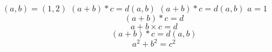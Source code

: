 \((a ,b)=(1 ,2)\)  %
\(( a+b ) * c = d(a ,b)\)  %
$( a+b ) * c = d(a ,b)$    %
$a=1$  %
\[( a+b ) * c = d\]  %
\[a + b\times  c = d\]  %
\[( a+b ) * c = d(a ,b)\]  %
\begin{equation}
a^2+b^2=c^2
\end{equation}
